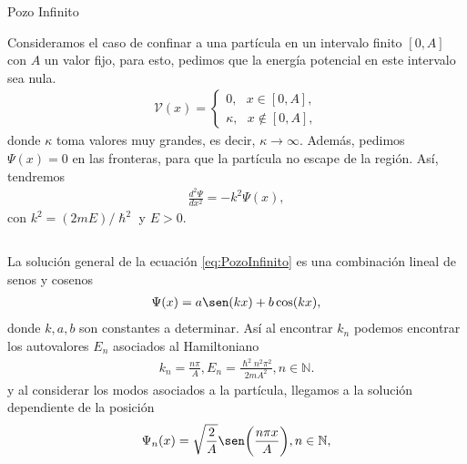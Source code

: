 \documentclass[aspectratio=1610]{beamer}
\newcommand*{\field}[1]{\mathbb{#1}}
\begin{document}
\begin{frame}{Pozo Infinito}
   
Consideramos el caso de confinar a una partícula en un intervalo finito $[0 , A]$ con $A$ un valor fijo, para esto, pedimos que la energía potencial en este intervalo sea nula.
\begin{align*}
        \mathcal{V}(x) = 
        \left\{ \begin{array}{ll}
        0, \:\:\:  x \in [0,A],
        \\
        \kappa, \:\:\: x \notin [0,A],
        \end{array}
        \right.
\end{align*}
donde $\kappa$ toma valores muy grandes, es decir, $\kappa \to\infty$. Además, pedimos $\Psi(x) = 0$ en las fronteras, para que la partícula no escape de la región. Así, tendremos 
\begin{align}
    \frac{d^2\Psi}{dx^2} = -k^2\Psi(x),
    \label{eq:PozoInfinito}
\end{align}
con $k^2 = (2mE)/\hslash^2$ y $ E>0.$
    
\begin{columns}
\column{37em}
\end{columns}
\end{frame}


\begin{frame}{}
 La solución general de la ecuación \eqref{eq:PozoInfinito} es una combinación lineal de senos y cosenos
\begin{align*}
    \Psi(x) = a\sen(kx) + b\cos(kx),
\end{align*}   
donde $k,a,b$ son constantes a determinar. Así al encontrar $k_{n}$ podemos encontrar los autovalores $E_{n}$ asociados al Hamiltoniano
\begin{align*}
    k_{n}=\frac{n\pi}{A}, E_{n} = \frac{\hslash^2n^2\pi^2}{2mA^2}, n \in \field{N}.
\end{align*}
y al considerar los modos asociados a la partícula, llegamos a la solución dependiente de la posición
\begin{align}
    \Psi_{n}(x) = \sqrt{\frac{2}{A}}\sen\bigg(\frac{n\pi x}{A}\bigg), n \in \field{N},
    \label{eq:PsiPI}
\end{align}
    
\end{frame}
\end{document}
